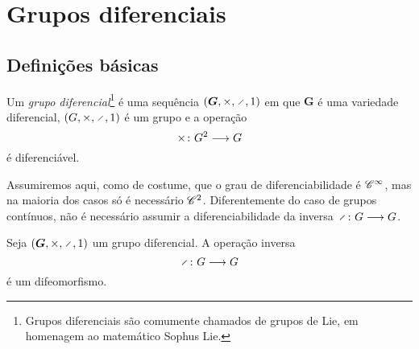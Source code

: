 \chapter{Grupos diferenciais}

\section{Definições básicas}

\begin{definition}
Um \emph{grupo diferencial}\footnote{Grupos diferenciais são comumente chamados de grupos de Lie, em homenagem ao matemático Sophus Lie.} é uma sequência $(\bm G,\times,\div,\id)$ em que $\bm G$ é uma variedade diferencial, $(G,\times,\div,\id)$ é um grupo e a operação
	\begin{equation*}
	{\times}\colon {G^2} \longrightarrow {G}
	\end{equation*}
é diferenciável.
\end{definition}

Assumiremos aqui, como de costume, que o grau de diferenciabilidade é $\mathscr{C}^\infty$, mas na maioria dos casos só é necessário $\mathscr{C}^2$. Diferentemente do caso de grupos contínuos, não é necessário assumir a diferenciabilidade da inversa $\fun{\div}{G}{G}$.

\begin{proposition}
Seja $(\bm G,\times,\div,\id)$ um grupo diferencial. A operação inversa
	\begin{equation*}
		\fun{\div}{G}{G}
	\end{equation*}
é um difeomorfismo.
\end{proposition}